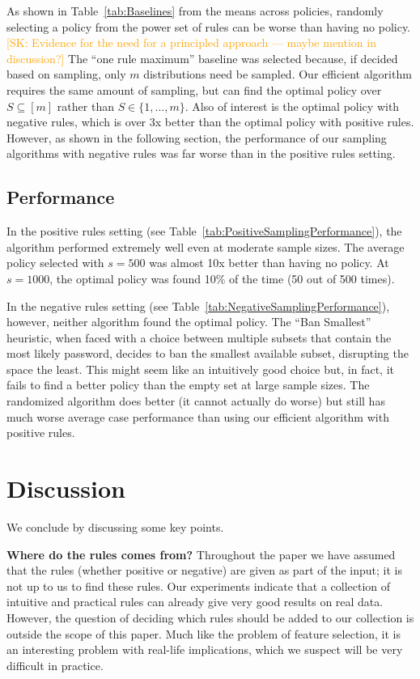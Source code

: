 \documentclass[prodmode,acmec]{ec-acmsmall}
\newcommand{\kibitz}[2]{\ifnum\Comments=1\textcolor{#1}{#2}\fi}
\newcommand{\sk}[1]{\kibitz{orange} {[SK: #1]}}
\begin{document}
As shown in Table~\ref{tab:Baselines} from the means across policies, randomly selecting a policy from the power set of rules can be worse than having no policy. \sk{Evidence for the need for a principled approach --- maybe mention in discussion?} The ``one rule maximum'' baseline was selected because, if decided based on sampling, only $m$ distributions need be sampled. Our efficient algorithm requires the same amount of sampling, but can find the optimal policy over $S \subseteq [m]$ rather than $S \in \{1,...,m\}$. Also of interest is the optimal policy with negative rules, which is over 3x better than the optimal policy with positive rules. However, as shown in the following section, the performance of our sampling algorithms with negative rules was far worse than in the positive rules setting.

\subsection{Performance}

In the positive rules setting (see Table~\ref{tab:PositiveSamplingPerformance}), the algorithm performed extremely well even at moderate sample sizes. The average policy selected with $s = 500$ was almost 10x better than having no policy. At $s = 1000$, the optimal policy was found 10\% of the time (50 out of 500 times).

In the negative rules setting (see Table~\ref{tab:NegativeSamplingPerformance}), however, neither algorithm found the optimal policy. The ``Ban Smallest'' heuristic, when faced with a choice between multiple subsets that contain the most likely password, decides to ban the smallest available subset, disrupting the space the least. This might seem like an intuitively good choice but, in fact, it fails to find a better policy than the empty set at large sample sizes. The randomized algorithm does better (it cannot actually do worse) but still has much worse average case performance than using our efficient algorithm with positive rules. 


\section{Discussion}
\label{sec:disc}

We conclude by discussing some key points. 

\medskip
\noindent\textbf{Where do the rules comes from?} Throughout the paper we have assumed that the rules (whether positive or negative) are given as part of the input; it is not up to us to find these rules. Our experiments indicate that a collection of intuitive and practical rules can already give very good results on real data. However, the question of deciding which rules should be added to our collection is outside the scope of this paper. Much like the problem of feature selection, it is an interesting problem with real-life implications, which we suspect will be very difficult in practice.
\end{document}

